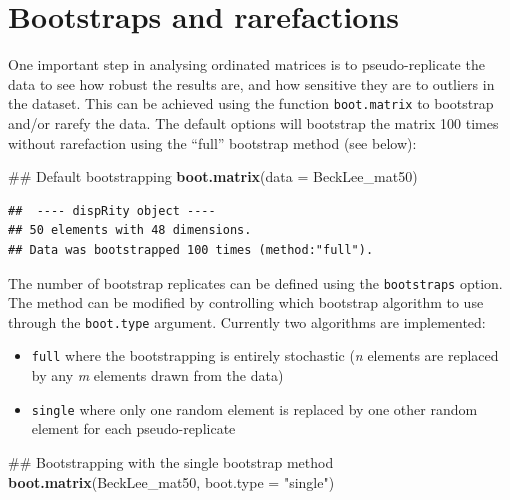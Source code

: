 \documentclass[]{book}
\newenvironment{Shaded}{\begin{snugshade}}{\end{snugshade}}
\newcommand{\KeywordTok}[1]{\textcolor[rgb]{0.13,0.29,0.53}{\textbf{#1}}}
\newcommand{\DataTypeTok}[1]{\textcolor[rgb]{0.13,0.29,0.53}{#1}}
\newcommand{\StringTok}[1]{\textcolor[rgb]{0.31,0.60,0.02}{#1}}
\newcommand{\NormalTok}[1]{#1}
\providecommand{\tightlist}{%
  \setlength{\itemsep}{0pt}\setlength{\parskip}{0pt}}
\theoremstyle{definition}
\theoremstyle{definition}
\theoremstyle{remark}
\begin{document}
\hypertarget{bootstraps-and-rarefactions}{\section{Bootstraps and
rarefactions}\label{bootstraps-and-rarefactions}}

One important step in analysing ordinated matrices is to
pseudo-replicate the data to see how robust the results are, and how
sensitive they are to outliers in the dataset. This can be achieved
using the function \texttt{boot.matrix} to bootstrap and/or rarefy the
data. The default options will bootstrap the matrix 100 times without
rarefaction using the ``full'' bootstrap method (see below):

\begin{Shaded}
\begin{Highlighting}[]
\NormalTok{## Default bootstrapping}
\KeywordTok{boot.matrix}\NormalTok{(}\DataTypeTok{data =}\NormalTok{ BeckLee_mat50)}
\end{Highlighting}
\end{Shaded}

\begin{verbatim}
##  ---- dispRity object ---- 
## 50 elements with 48 dimensions.
## Data was bootstrapped 100 times (method:"full").
\end{verbatim}

The number of bootstrap replicates can be defined using the
\texttt{bootstraps} option. The method can be modified by controlling
which bootstrap algorithm to use through the \texttt{boot.type}
argument. Currently two algorithms are implemented:

\begin{itemize}
\tightlist
\item
  \texttt{full} where the bootstrapping is entirely stochastic (\emph{n}
  elements are replaced by any \emph{m} elements drawn from the data)
\item
  \texttt{single} where only one random element is replaced by one other
  random element for each pseudo-replicate
\end{itemize}

\begin{Shaded}
\begin{Highlighting}[]
\NormalTok{## Bootstrapping with the single bootstrap method}
\KeywordTok{boot.matrix}\NormalTok{(BeckLee_mat50, }\DataTypeTok{boot.type =} \StringTok{"single"}\NormalTok{)}
\end{Highlighting}
\end{Shaded}
\end{document}
